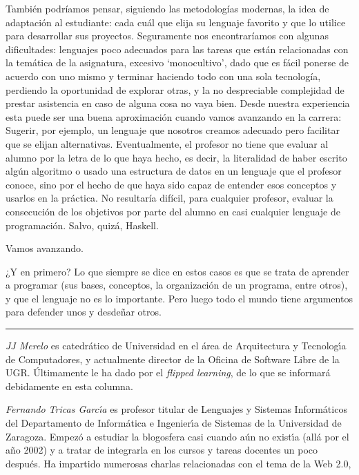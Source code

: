 \documentclass[twoside,10pt]{article}
\newcounter{num}
\begin{document}
\begin{multicols}{2}
También podríamos pensar, siguiendo las metodologías modernas, la idea de
adaptación al estudiante: cada cuál que elija su lenguaje favorito y que lo
utilice
para desarrollar sus proyectos. Seguramente nos encontraríamos con algunas
dificultades: lenguajes poco adecuados para las tareas que están
relacionadas con la temática de la asignatura, excesivo `monocultivo',
dado que es fácil ponerse de acuerdo con uno mismo y terminar haciendo todo
con una sola tecnología, perdiendo la oportunidad de explorar otras, y la
no despreciable complejidad de prestar asistencia en caso de alguna cosa no
vaya bien. Desde nuestra experiencia esta puede ser una buena aproximación
cuando vamos avanzando en la carrera: Sugerir, por ejemplo, un lenguaje que
nosotros creamos adecuado pero facilitar que se elijan alternativas.
Eventualmente, el profesor no tiene que evaluar al
alumno por la letra de lo que haya hecho, es decir, la literalidad de
haber escrito algún algoritmo o usado una estructura de datos en un
lenguaje que el profesor conoce, sino por el hecho de que haya sido
capaz de entender esos conceptos y usarlos en la práctica. No
resultaría difícil, para cualquier profesor, evaluar la consecución de
los objetivos por parte del alumno en casi cualquier lenguaje de
programación. Salvo, quizá, Haskell. 

Vamos avanzando.

¿Y en primero? 
Lo que siempre se dice en estos casos es que se trata de aprender a
programar (sus bases, conceptos, la organización de un programa, entre
otros), y que el lenguaje no es lo
importante. Pero luego todo el mundo tiene argumentos para defender unos
y desdeñar otros.
\noindent\rule{86mm}{1pt}
\vspace{1ex} {\small{\begin{window} 
\noindent\emph{JJ Merelo} es catedr\'{a}tico de Universidad
en el \'area de Arquitectura y Tecnolog\'{\i}a de Computadores, y
actualmente director de la Oficina de Software Libre de la UGR.
\'{U}ltimamente le ha dado por el \textsl{flipped
learning}, de lo que se informar\'{a} debidamente en esta columna.
\end{window}}}

\medskip

{\small{\begin{window}
		\noindent \emph{Fernando Tricas Garc\'{\i}a} es profesor
		titular de Lenguajes y Sistemas Inform\'{a}ticos del Departamento
		de Inform\'{a}tica e Ingenier\'{\i}a de Sistemas de la Universidad de
		Zaragoza.  Empez\'{o} a estudiar la blogosfera casi cuando a\'{u}n no
		exist\'{\i}a (all\'{a} por el a\~{n}o 2002) y a tratar de integrarla en los
		cursos y tareas docentes un poco despu\'{e}s.  Ha impartido
		numerosas charlas relacionadas con el tema de la Web 2.0, 


\end{window}}}
\end{multicols}
\end{document}
